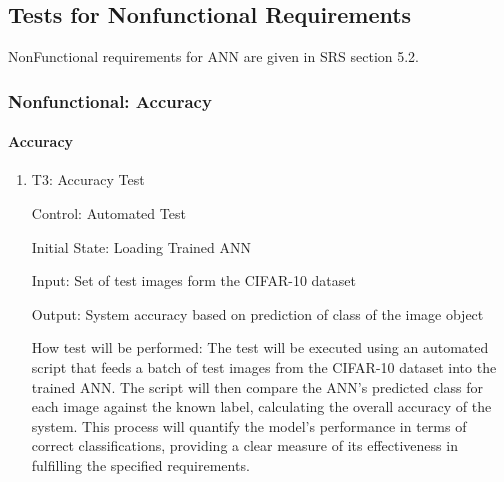 \documentclass[12pt, titlepage]{article}
\begin{document}
\subsection{Tests for Nonfunctional Requirements}

NonFunctional requirements for ANN are given in 
SRS \cite{SRS} section 5.2.




\subsubsection{Nonfunctional: Accuracy} \label{NFAccuracy}
		
\paragraph{Accuracy}

\begin{enumerate}

  \item{T3: Accuracy Test\\}

  Control: Automated Test
  
  Initial State: Loading Trained ANN
  
  Input: Set of test images form the CIFAR-10 dataset \cite{CIFAR10}
  
  Output: System accuracy based on prediction of class of the image object

  How test will be performed: The test will be executed using an automated 
  script that feeds a batch of test images from the CIFAR-10 dataset \cite{CIFAR10} 
  into the trained ANN. 
  The script will then compare the ANN's predicted class for each image against 
  the known label, calculating the overall accuracy of the system. This process 
  will quantify the model's performance in terms of correct classifications, 
  providing a clear measure of its effectiveness in fulfilling the specified requirements.

\end{enumerate}
\end{document}

